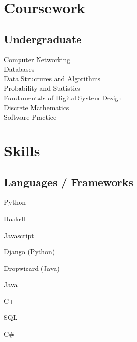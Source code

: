 \documentclass[letterpaper]{deedy-resume} %
\begin{document}
\begin{minipage}[t]{0.35\textwidth}
\section{Coursework}


\subsection{Undergraduate}

Computer Networking \\
Databases \\
Data Structures and Algorithms \\
Probability and Statistics \\
Fundamentals of Digital System Design \\
Discrete Mathematics \\
Software Practice \\


\sectionspace %


\section{Skills}

\subsection{Languages / Frameworks}
\begin{tightitemize}
\vspace{\topsep} %
\item Python
\item Haskell
\item Javascript
\item Django (Python)
\item Dropwizard (Java)
\item Java
\item C++
\item SQL
\item C\#
\end{tightitemize}


\end{minipage}
\end{document}
